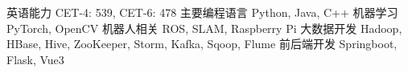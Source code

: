 

\begin{cvskills}
    \cvskill
    {英语能力} %
    {CET-4: 539, CET-6: 478} %
  \cvskill
    {主要编程语言} %
    {Python, Java, C++} %
    \cvskill
    {机器学习} %
    {PyTorch, OpenCV} %
    \cvskill
    {机器人相关} %
    {ROS, SLAM, Raspberry Pi} %
  \cvskill
    {大数据开发} %
    {Hadoop, HBase, Hive, ZooKeeper, Storm, Kafka, Sqoop, Flume} %
    \cvskill
    {前后端开发} %
    {Springboot, Flask, Vue3} %

\end{cvskills}
